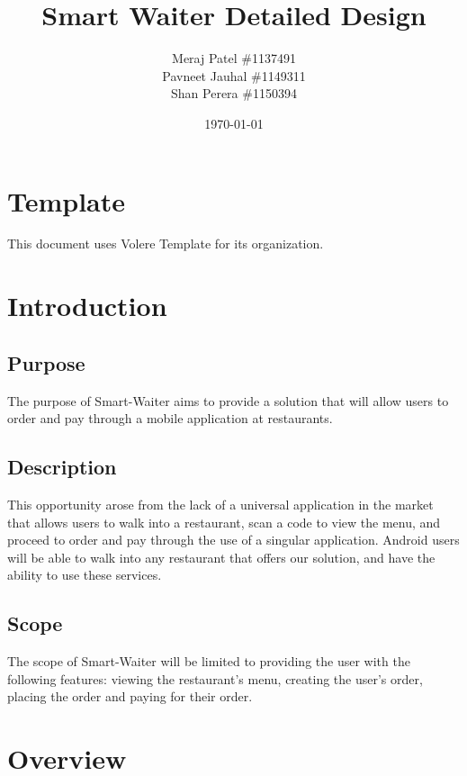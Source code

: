 \documentclass[12pt, titlepage]{article}
\begin{document}
\title{Smart Waiter Detailed Design} 
\author{Meraj Patel \#1137491 \\ Pavneet Jauhal \#1149311\\ Shan Perera \#1150394}
\date{\today}
\maketitle

\tableofcontents 

\listoffigures

\listoftables


\section*{Template}
This document uses Volere Template for its organization.
\pagebreak

\section{Introduction}

\subsection{Purpose}
The purpose of Smart-Waiter aims to provide a solution that will allow users to order and pay through a mobile application at restaurants. 

\subsection{Description}
This opportunity arose from the lack of a universal application in the market that allows users to walk into a restaurant, scan a code to view the menu, and proceed to order and pay through the use of a singular application. Android users will be able to walk into any restaurant that offers our solution, and have the ability to use these services.

\subsection{Scope}
The scope of Smart-Waiter will be limited to providing the user with the following features: viewing the restaurant's menu, creating the user's order, placing the order and paying for their order. 
 
\section{Overview}
\end{document}
